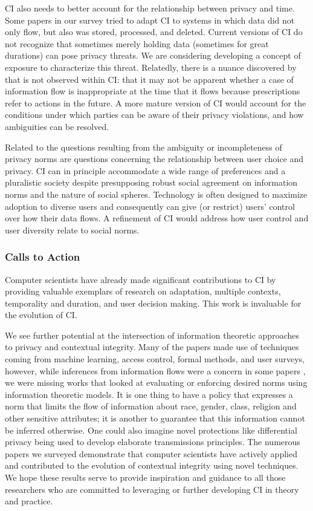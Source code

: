 \documentclass[../thesis.tex]{subfiles}
\begin{document}
CI also needs to better account for the relationship between privacy and
time. Some papers in our survey tried to adapt CI to systems in which
data did not only flow, but also was stored, processed, and
deleted.
Current versions of CI do not
recognize that sometimes merely holding data (sometimes for great
durations) can pose privacy threats. We are considering developing a
concept of exposure to characterize this threat. Relatedly, there is a
nuance discovered by \citet{datta2011understanding} that is not observed within
CI: that it may not be apparent whether a case of information flow is
inappropriate at the time that it flows because prescriptions refer to
actions in the future. A more mature version of CI would account for
the conditions under which parties can be aware of their privacy
violations, and how ambiguities can be resolved.

Related to the questions resulting from the ambiguity or incompleteness
of privacy norms are questions concerning the relationship between user
choice and privacy. CI can in principle accommodate a wide range of
preferences and a pluralistic society despite presupposing robust
social agreement on information norms and the nature of social spheres.
Technology is often designed to maximize adoption to diverse users and
consequently can give (or restrict) users' control over
how their data flows. A refinement of CI would address how user control
and user diversity relate to social norms.

\subsubsection{Calls to Action}
\label{CI5.4.2}

Computer scientists have already made significant contributions to CI by
providing valuable exemplars of research on adaptation, multiple
contexts, temporality and duration, and user decision making. This work
is invaluable for the evolution of CI.

We see further potential at the intersection of information theoretic
approaches to privacy and contextual integrity. Many of the papers made
use of techniques coming from machine learning, access control, formal
methods, and user surveys, however, while inferences from information
flows were a concern in some papers \cite{omoronyia2012caprice}
\cite{omoronyia2013engineering} \cite{datta2011understanding},
we were missing works that looked at
evaluating or enforcing desired norms using information theoretic
models. It is one thing to have a policy that expresses a norm
that limits
the flow of information about race, gender, class, religion and other
sensitive attributes; it is another to guarantee that this information
cannot be inferred otherwise. One could also imagine novel protections
like differential privacy being used to develop elaborate transmissions
principles. The numerous papers we surveyed demonstrate that computer
scientists have actively applied and contributed to the evolution of
contextual integrity using novel techniques. We hope these results
serve to provide inspiration and guidance to all those researchers who
are committed to leveraging or further developing CI in theory and
practice.
 
\end{document}
